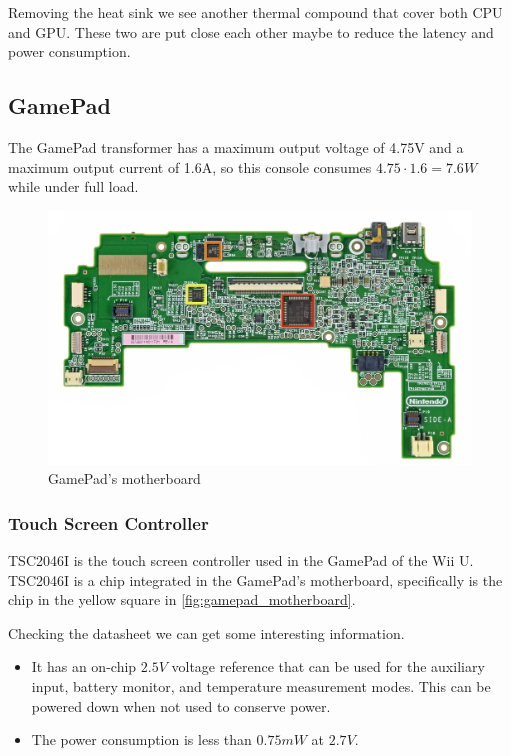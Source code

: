 \documentclass[11pt,a4paper,titlepage]{article}
\begin{document}
		Removing the heat sink we see another thermal compound that cover both CPU and GPU. These two are put close each other maybe to reduce the latency and power consumption.

	\subsection{GamePad}
		The GamePad transformer has a maximum output voltage of 4.75V and a maximum output current of 1.6A, so this console consumes $4.75\cdot 1.6 = 7.6W$ while under full load.
		\begin{figure}[htbp]
			\includegraphics[width=\textwidth]{gamepad_motherboard_front.png}
			\caption{GamePad's motherboard}
			\label{fig:gamepad_motherboard}
		\end{figure}
		\subsubsection{Touch Screen Controller}
			TSC2046I is the touch screen controller used in the GamePad of the Wii U. TSC2046I is a chip integrated in the GamePad's motherboard, specifically is the chip in the yellow square in \autoref{fig:gamepad_motherboard}.

			Checking the datasheet \cite{touchscreen} we can get some interesting information.
			\begin{itemize}
				\item It has an on-chip $2.5V$ voltage reference that can be used for the auxiliary input, battery monitor, and temperature measurement modes. This can be powered down when not used to conserve power.
				\item The power consumption is less than $0.75mW$ at $2.7V$.
			\end{itemize}
\end{document}
